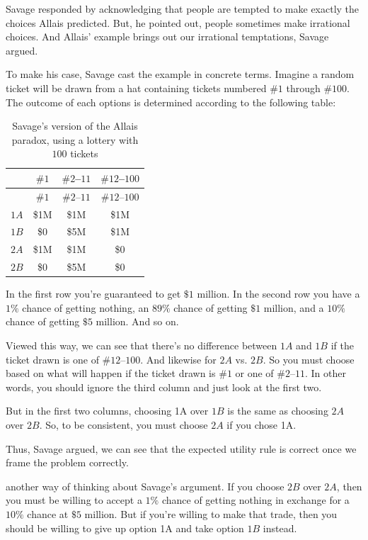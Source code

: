 \documentclass[justified]{tufte-book}
\theoremstyle{definition}
\theoremstyle{definition}
\theoremstyle{definition}
\theoremstyle{remark}
\begin{document}
Savage responded by acknowledging that people are tempted to make exactly the choices Allais predicted. But, he pointed out, people sometimes make irrational choices. And Allais' example brings out our irrational temptations, Savage argued.

To make his case, Savage cast the example in concrete terms. Imagine a random ticket will be drawn from a hat containing tickets numbered \(\#1\) through \(\#100\). The outcome of each options is determined according to the following table:

\begin{longtable}[]{@{}lccc@{}}
\caption{\label{tab:unnamed-chunk-117}Savage's version of the Allais paradox, using a lottery with \(100\) tickets}\tabularnewline
\toprule
& \(\#1\) & \(\#2\)--\(11\) & \(\#12\)--\(100\)\tabularnewline
\midrule
\endfirsthead
\toprule
& \(\#1\) & \(\#2\)--\(11\) & \(\#12\)--\(100\)\tabularnewline
\midrule
\endhead
\(1A\) & \$1M & \$1M & \$1M\tabularnewline
\(1B\) & \$0 & \$5M & \$1M\tabularnewline
\(2A\) & \$1M & \$1M & \$0\tabularnewline
\(2B\) & \$0 & \$5M & \$0\tabularnewline
\bottomrule
\end{longtable}

In the first row you're guaranteed to get \(\$1\) million. In the second row you have a \(1\%\) chance of getting nothing, an \(89\%\) chance of getting \(\$1\) million, and a \(10\%\) chance of getting \(\$5\) million. And so on.

Viewed this way, we can see that there's no difference between \(1A\) and \(1B\) if the ticket drawn is one of \(\#12\)--\(100\). And likewise for \(2A\) vs. \(2B\). So you must choose based on what will happen if the ticket drawn is \(\#1\) or one of \(\#2\)--\(11\). In other words, you should ignore the third column and just look at the first two.

But in the first two columns, choosing 1A over \(1B\) is the same as choosing \(2A\) over \(2B\). So, to be consistent, you must choose \(2A\) if you chose 1A.

Thus, Savage argued, we can see that the expected utility rule is correct once we frame the problem correctly.

 another way of thinking about Savage's argument. If you choose \(2B\) over \(2A\), then you must be willing to accept a \(1\%\) chance of getting nothing in exchange for a \(10\%\) chance at \(\$5\) million. But if you're willing to make that trade, then you should be willing to give up option 1A and take option \(1B\) instead.
\end{document}

